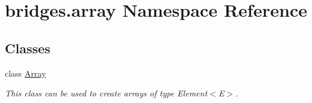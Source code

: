 \hypertarget{namespacebridges_1_1array}{}\section{bridges.\+array Namespace Reference}
\label{namespacebridges_1_1array}
\subsection*{Classes}
\begin{DoxyCompactItemize}
\item 
class \mbox{\hyperlink{classbridges_1_1array_1_1_array}{Array}}
\begin{DoxyCompactList}\small\item\em This class can be used to create arrays of type Element$<$\+E$>$. \end{DoxyCompactList}\end{DoxyCompactItemize}

